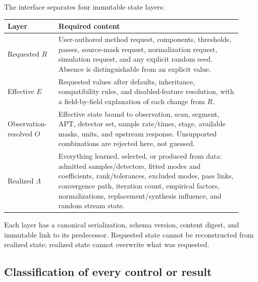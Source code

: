 \documentclass[11pt]{article}
\begin{document}
The interface separates four immutable state layers:
\begin{longtable}{>{\raggedright\arraybackslash}p{0.20\linewidth}
                  >{\raggedright\arraybackslash}p{0.72\linewidth}}
\toprule
Layer & Required content \\
\midrule
\endhead
Requested $R$ & User-authored method request, components, thresholds, passes,
source-mask request, normalization request, simulation request, and any
explicit random seed.  Absence is distinguishable from an explicit value.\\
Effective $E$ & Requested values after defaults, inheritance, compatibility
rules, and disabled-feature resolution, with a field-by-field explanation of
each change from $R$.\\
Observation-resolved $O$ & Effective state bound to observation, scan, segment,
APT, detector set, sample rate/times, stage, available masks, units, and
upstream response.  Unsupported combinations are rejected here, not guessed.\\
Realized $\Lambda$ & Everything learned, selected, or produced from data: admitted
samples/detectors, fitted modes and coefficients, rank/tolerances, excluded
modes, pass links, convergence path, iteration count, empirical factors,
normalizations, replacement/synthesis influence, and random stream state.\\
\bottomrule
\end{longtable}
Each layer has a canonical serialization, schema version, content digest, and
immutable link to its predecessor.  Requested state cannot be reconstructed
from realized state; realized state cannot overwrite what was requested.

\subsection{Classification of every control or result}
\end{document}
